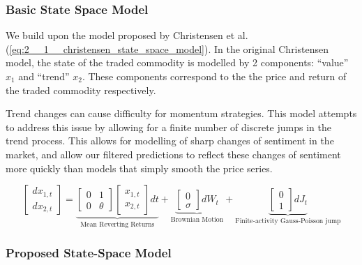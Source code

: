 \documentclass[../main.tex]{subfiles}
\begin{document}
\subsubsection{Basic State Space Model}

We build upon the model proposed by Christensen et al. \cite{christensen2012forecasting} (\autoref{eq:2__1__christensen_state_space_model}). In the original Christensen model, the state of the traded commodity is modelled by 2 components: ``value'' $x_1$ and ``trend'' $x_2$. These components correspond to the the price and return of the traded commodity respectively. 


Trend changes can cause difficulty for momentum strategies. This model attempts to address this issue by allowing for a finite number of discrete jumps in the trend process. This allows for modelling of sharp changes of sentiment in the market, and allow our filtered predictions to reflect these changes of sentiment more quickly than models that simply smooth the price series. 

\begin{equation}
    \begin{bmatrix}
    dx_{1,t} \\ dx_{2,t}
    \end{bmatrix} = 
    \underbrace{
        \begin{bmatrix}
        0 & 1 \\ 0 & \theta
        \end{bmatrix}
        \begin{bmatrix}
        x_{1,t} \\ x_{2,t}
        \end{bmatrix} dt
    }_{\text{Mean Reverting Returns}} 
    + 
    \underbrace{
        \begin{bmatrix}
        0 \\ \sigma
        \end{bmatrix} dW_t
    }_{\text{Brownian Motion}}
    + 
    \underbrace{
        \begin{bmatrix}
        0 \\ 1
        \end{bmatrix} dJ_t
    }_{\text{Finite-activity Gauss-Poisson jump}}
    \label{eq:2__1__christensen_state_space_model}
\end{equation}

\subsubsection{Proposed State-Space Model}
\end{document}
